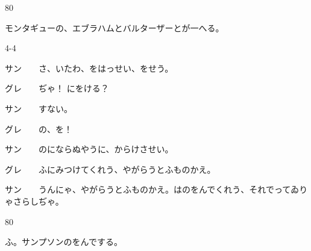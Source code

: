 \documentclass[tate,paper=b6j,jafontsize=9pt]{jlreq}
\begin{document}
\begin{azconvIndented}{8\zw}{0\zw}

モンタギューの、エブラハムとバルターザーとが一へる。

\end{azconvIndented}
\begin{azconvIndented}{4\zw}{-4\zw}

サン　　さ、いたわ、をはっせい、をせう。

グレ　　ぢゃ！ にをける？

サン　　すない。

グレ　　の、を！

サン　　のにならぬやうに、からけさせい。

グレ　　ふにみつけてくれう、やがらうとふものかえ。

サン　　うんにゃ、やがらうとふものかえ。はのをんでくれう、それでってゐりゃさらしぢゃ。

\end{azconvIndented}
\begin{azconvIndented}{8\zw}{0\zw}

ふ。サンプソンのをんでする。

\end{azconvIndented}
\end{document}
